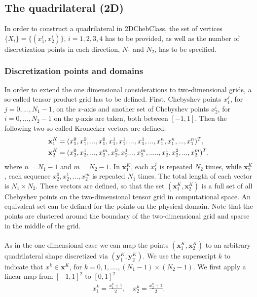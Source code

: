 \documentclass[11pt, a4paper]{article}
\theoremstyle{definition}
\begin{document}
\subsection{The quadrilateral (2D)}
In order to construct a quadrilateral in 2DChebClass, the set of vertices $\{X_i\} = \{(x_1^i,x_2^i)\}$, $i = 1,2,3,4$ has to be provided, as well as the number of discretization points in each direction, $N_1$ and $N_2$, has to be specified.
\subsubsection{Discretization points and domains}
In order to extend the one dimensional considerations to two-dimensional grids, a so-called tensor product grid has to be defined. First, Chebyshev points $x_1^j$, for $j=0,...,N_1-1$, on the $x$-axis and another set of Chebyshev points $x_2^i$, for $i=0,...,N_2-1$ on the $y$-axis are taken, both between $[-1,1]$. 
Then the following two so called Kronecker vectors are defined:
\begin{align}\label{eq:KroneckerVec}
	\mathbf{x}_1^{K}&=(x_1^0,x_1^0,...,x_1^0,x_1^1,x_1^1,...,x_1^1,...,x_1^n,x_1^n,...,x_1^n)^T,\\
	\mathbf{x}_2^{K}&=(x_2^0,x_2^1,...,x_2^m,x_2^0,x_2^1...,x_2^m,.....,x_2^1,x_2^2,...,x_2^m)^T,\notag
\end{align} 
where $n = N_1 - 1$ and $m = N_2 -1$.
In $\mathbf{x}_1^{K}$, each $x_1^j$ is repeated $N_2$ times, while $\mathbf{x}_2^{K}$, each sequence $x_2^0,x_2^1,...,x_2^m$ is repeated $N_1$ times. The total length of each vector is $N_1 \times N_2$. 
These vectors are defined, so that the set $(\mathbf{x}_1^{K},\mathbf{x}_2^{K})$ is a full set of all Chebyshev points on the two-dimensional tensor grid in computational space. An equivalent set can be defined for the points on the physical domain. Note that the points are clustered around the boundary of the two-dimensional grid and sparse in the middle of the grid.
\\
\\
As in the one dimensional case we can map the points $(\mathbf{x}_1^{K},\mathbf{x}_2^{K})$ to an arbitrary quadrilateral shape discretized via $(\mathbf{y}_1^{K},\mathbf{y}_2^{K})$. We use the superscript $k$ to indicate that $x^k \in \mathbf{x}^{K}$, for $k = 0,1,....,(N_1 - 1)\times (N_2 - 1)$. We first apply a linear map from $[-1,1]^2$ to $[0,1]^2$ 
\begin{align*}
	x_1^k = \frac{x_1^k+1}{2}, \quad
	x_2^k = \frac{x_2^k+1}{2}.
\end{align*}
\end{document}
